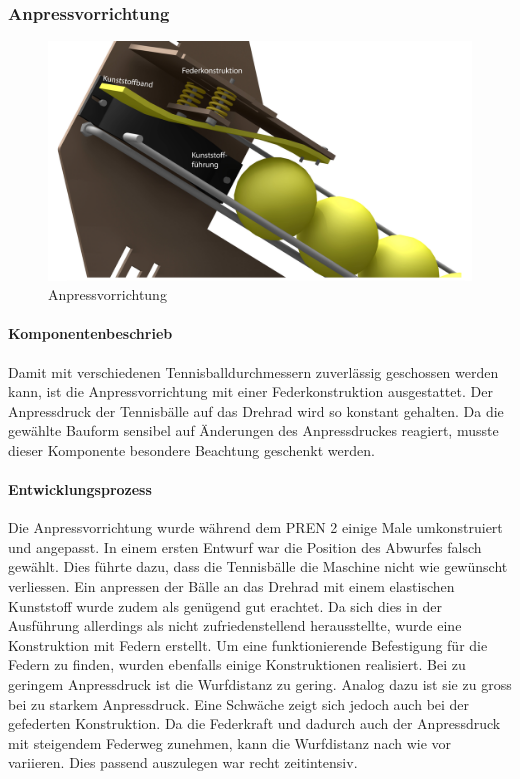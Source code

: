 \subsubsection{Anpressvorrichtung}
\begin{figure}[h!]
	\centering
	\includegraphics[width=\linewidth]{../../fig/Render-Anpressvorrichtungx}
	\caption{Anpressvorrichtung}
	\label{fig:Anpressvorrichtung}
\end{figure}

\paragraph{Komponentenbeschrieb}
Damit mit verschiedenen Tennisballdurchmessern zuverlässig geschossen werden kann, ist die Anpressvorrichtung mit einer Federkonstruktion ausgestattet. Der Anpressdruck der Tennisbälle auf das Drehrad wird so konstant gehalten. Da die gewählte Bauform sensibel auf Änderungen des Anpressdruckes reagiert, musste dieser Komponente besondere Beachtung geschenkt werden. 

\paragraph{Entwicklungsprozess}
Die Anpressvorrichtung wurde während dem PREN 2 einige Male umkonstruiert und angepasst. In einem ersten Entwurf war die Position des Abwurfes falsch gewählt. Dies führte dazu, dass die Tennisbälle die Maschine nicht wie gewünscht verliessen. Ein anpressen der Bälle an das Drehrad mit einem elastischen Kunststoff wurde zudem als genügend gut erachtet. Da sich dies in der Ausführung allerdings als nicht zufriedenstellend herausstellte, wurde eine Konstruktion mit Federn erstellt. Um eine funktionierende Befestigung für die Federn zu finden, wurden ebenfalls einige Konstruktionen realisiert. Bei zu geringem Anpressdruck ist die Wurfdistanz zu gering. Analog dazu ist sie zu gross bei zu starkem Anpressdruck. Eine Schwäche zeigt sich jedoch auch bei der gefederten Konstruktion. Da die Federkraft und dadurch auch der Anpressdruck mit steigendem Federweg zunehmen, kann die Wurfdistanz nach wie vor variieren. Dies passend auszulegen war recht zeitintensiv.